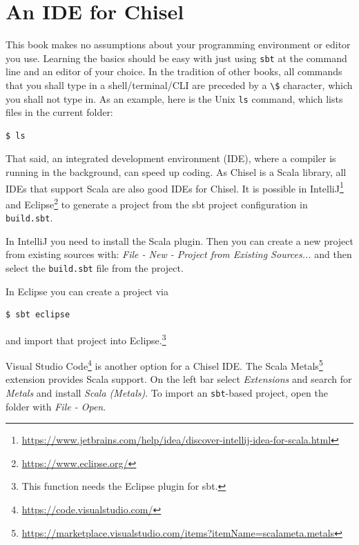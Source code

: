 \documentclass[%
    10pt,
    headinclude, footexclude,
    openright, %
    notitlepage,
    cleardoubleempty,
    headsepline,
    pointlessnumbers,
    bibtotoc, idxtotoc,
    ]{scrbook}
\newcommand{\code}[1]{{\lstinline[basicstyle=\small\ttfamily]{#1}}}
\newcommand{\myref}[2]{\href{#1}{#2}}
\renewcommand{\myref}[2]{{#2}{\footnote{\url{#1}}}}
\begin{document}
\section{An IDE for Chisel}

This book makes no assumptions about your programming environment or editor you use.
Learning the basics should be easy with just using \code{sbt} at the command line
and an editor of your choice. In the tradition of other books, all commands that you
shall type in a shell/terminal/CLI are preceded by a \code{\$} character, which you
shall not type in. As an example, here is the Unix \code{ls} command, which lists files in
the current folder:

\begin{verbatim}
$ ls
\end{verbatim}

That said, an integrated development environment (IDE), where a compiler is running in
the background, can speed up coding. As Chisel is a Scala library, all IDEs
that support Scala are also good IDEs for Chisel.
It is possible in
\myref{https://www.jetbrains.com/help/idea/discover-intellij-idea-for-scala.html}{IntelliJ} and
 \myref{https://www.eclipse.org/}{Eclipse}
to generate a project from the sbt project configuration in \code{build.sbt}.

In IntelliJ you need to install the Scala plugin. Then you can create a new project from existing sources with:
\emph{File - New - Project from Existing Sources...} and then select the \code{build.sbt}
file from the project.

In Eclipse you can create a project via
\begin{verbatim}
$ sbt eclipse
\end{verbatim}
and import that project into Eclipse.\footnote{This function needs the Eclipse plugin for sbt.}

\myref{https://code.visualstudio.com/}{Visual Studio Code} is another option for a Chisel IDE.
The \myref{https://marketplace.visualstudio.com/items?itemName=scalameta.metals}{Scala Metals}
extension provides Scala support.
On the left bar select \emph{Extensions} and search for \emph{Metals} and install \emph{Scala (Metals)}.
To import an \code{sbt}-based project, open the folder with \emph{File - Open}.

\end{document}
